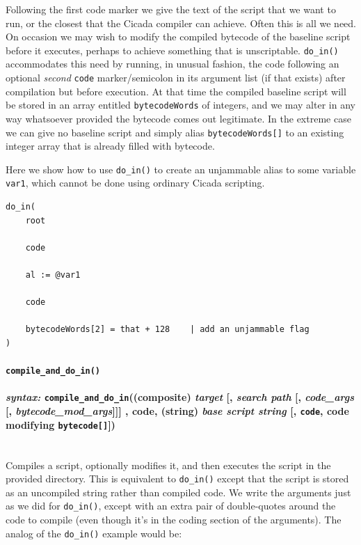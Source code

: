 \documentclass{article}
\newenvironment{code}{
       \begin{list}{}{
               \setlength{\leftmargin}{.4in}
               \setlength{\rightmargin}{0in}
               \setlength{\topsep}{.2in}
       }
       \small
       \item[] }
       { \end{list}   }
\begin{document}
Following the first code marker we give the text of the script that we want to run, or the closest that the Cicada compiler can achieve.  Often this is all we need.  On occasion we may wish to modify the compiled bytecode of the baseline script before it executes, perhaps to achieve something that is unscriptable.  \verb#do_in()# accommodates this need by running, in unusual fashion, the code following an optional \emph{second} \verb#code# marker/semicolon in its argument list (if that exists) after compilation but before execution.   At that time the compiled baseline script will be stored in an array entitled \verb#bytecodeWords# of integers, and we may alter in any way whatsoever provided the bytecode comes out legitimate.  In the extreme case we can give no baseline script and simply alias \verb#bytecodeWords[]# to an existing integer array that is already filled with bytecode.

Here we show how to use \verb#do_in()# to create an unjammable alias to some variable \verb#var1#, which cannot be done using ordinary Cicada scripting.

\begin{code} \begin{verbatim}
do_in(
    root
    
    code
    
    al := @var1
    
    code
    
    bytecodeWords[2] = that + 128    | add an unjammable flag
)

\end{verbatim} \end{code}



\paragraph{\texttt{compile\_and\_do\_in()}\\\\
\normalfont \emph{syntax: } \texttt{compile\_and\_do\_in}((composite) \emph{target} [, \emph{search path} [, \emph{code\_args} [, \emph{bytecode\_mod\_args}]]] , code, (string) \emph{base script string} [, \texttt{code}, code modifying \texttt{bytecode[]}])\\\\}

Compiles a script, optionally modifies it, and then executes the script in the provided directory.  This is equivalent to \verb#do_in()# except that the script is stored as an uncompiled string rather than compiled code.  We write the arguments just as we did for \verb#do_in()#, except with an extra pair of double-quotes around the code to compile (even though it's in the coding section of the arguments).  The analog of the \verb#do_in()# example would be:
\end{document}
